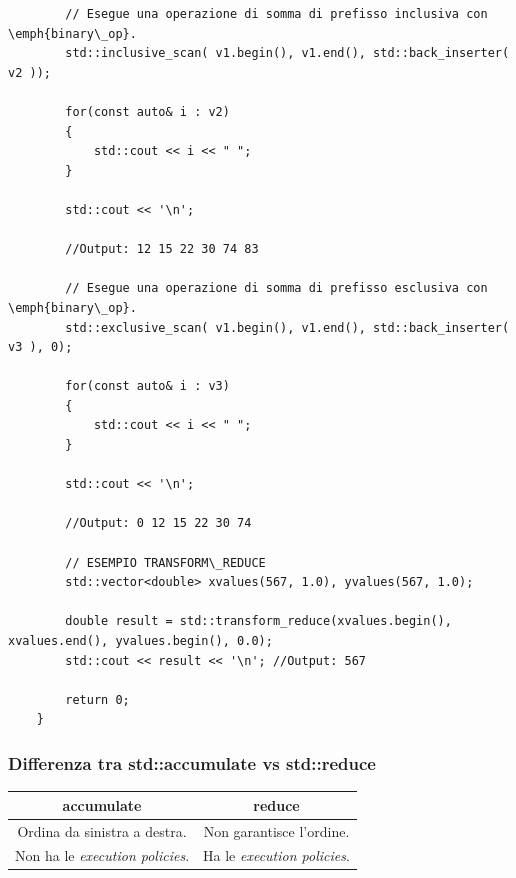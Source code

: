 \begin{lstlisting}
		// Esegue una operazione di somma di prefisso inclusiva con \emph{binary\_op}.
		std::inclusive_scan( v1.begin(), v1.end(), std::back_inserter( v2 ));
		
		for(const auto& i : v2)
		{
			std::cout << i << " ";
		}
		
		std::cout << '\n';
		
		//Output: 12 15 22 30 74 83
		
		// Esegue una operazione di somma di prefisso esclusiva con \emph{binary\_op}.
		std::exclusive_scan( v1.begin(), v1.end(), std::back_inserter( v3 ), 0);
		
		for(const auto& i : v3)
		{
			std::cout << i << " ";
		}
		
		std::cout << '\n';
		
		//Output: 0 12 15 22 30 74
		
		// ESEMPIO TRANSFORM\_REDUCE
		std::vector<double> xvalues(567, 1.0), yvalues(567, 1.0);
		
		double result = std::transform_reduce(xvalues.begin(), xvalues.end(), yvalues.begin(), 0.0);
		std::cout << result << '\n'; //Output: 567
		
		return 0;
	}
\end{lstlisting}


\subsubsection{Differenza tra std::accumulate vs std::reduce}

\begin{tabular}{|c|c|}
	\hline
	\textbf{accumulate} & \textbf{reduce} \\
	\hline
	\textsf{\small Ordina da sinistra a destra.} & \textsf{\small Non garantisce l'ordine.} \\
	\hline
	\textsf{\small Non ha le \emph{execution policies}.} & \textsf{\small Ha le \emph{execution policies}.} \\
	\hline
\end{tabular}





